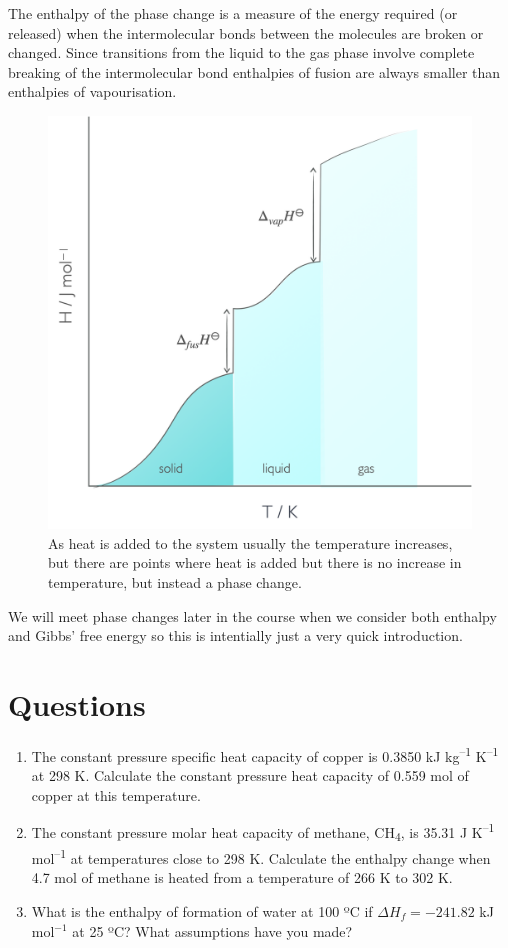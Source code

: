 \documentclass[
]{book}
\begin{document}
The enthalpy of the phase change is a measure of the energy required (or released) when the intermolecular bonds between the molecules are broken or changed. Since transitions from the liquid to the gas phase involve complete breaking of the intermolecular bond enthalpies of fusion are always smaller than enthalpies of vapourisation.

\begin{figure}

{\centering \includegraphics[width=0.7\linewidth]{images/enthalpyphasechange} 

}

\caption{As heat is added to the system usually the temperature increases, but there are points where heat is added but there is no increase in temperature, but instead a phase change.}\label{fig:enthalpyphasechange}
\end{figure}

We will meet phase changes later in the course when we consider both enthalpy and Gibbs' free energy so this is intentially just a very quick introduction.

\hypertarget{questions-2}{%
\section{Questions}\label{questions-2}}

\begin{enumerate}
\def\labelenumi{\arabic{enumi}.}
\item
  The constant pressure specific heat capacity of copper is 0.3850 kJ kg\textsuperscript{--1} K\textsuperscript{--1} at 298 K. Calculate the constant pressure heat capacity of 0.559 mol of copper at this temperature.
\item
  The constant pressure molar heat capacity of methane, CH\textsubscript{4}, is 35.31 J K\textsuperscript{--1} mol\textsuperscript{--1} at temperatures close to 298 K. Calculate the enthalpy change when 4.7 mol of methane is heated from a temperature of 266 K to 302 K.
\item
  What is the enthalpy of formation of water at 100 ºC if \(\Delta H_f = -241.82\) kJ mol\(^{-1}\) at 25 ºC? What assumptions have you made?
\end{enumerate}
\end{document}
